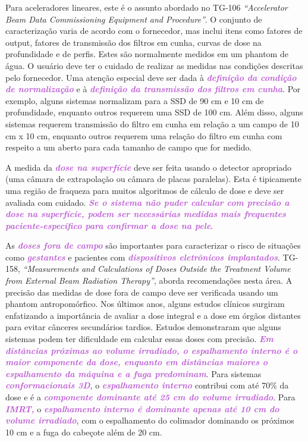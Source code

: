 \documentclass[11pt,a4paper]{article}
\newcounter{exemplo}
\begin{document}
	Para aceleradores lineares, este é o assunto abordado no TG-106 \textit{``Accelerator Beam Data Commissioning Equipment and Procedure''}. O conjunto de caracterização varia de acordo com o fornecedor, mas inclui itens como fatores de output, fatores de transmissão dos filtros em cunha, curvas de dose na profundidade e de perfis. Estes são normalmente medidos em um phantom de água. O usuário deve ter o cuidado de realizar as medidas nas condições descritas pelo fornecedor. Uma atenção especial deve ser dada à \textcolor{MediumOrchid}{\textbf{\textit{definição da condição de normalização}}} e à \textcolor{MediumOrchid}{\textbf{\textit{definição da transmissão dos filtros em cunha}}}. Por exemplo, alguns sistemas normalizam para a SSD de 90 cm e 10 cm de profundidade, enquanto outros requerem uma SSD de 100 cm. Além disso, alguns sistemas requerem transmissão do filtro em cunha em relação a um campo de 10 cm x 10 cm, enquanto outros requerem uma relação do filtro em cunha com respeito a um aberto para cada tamanho de campo que for medido.

	A medida da \textcolor{MediumOrchid}{\textbf{\textit{dose na superfície}}} deve ser feita usando o detector apropriado (uma câmara de extrapolação ou câmara de placas paralelas). Esta é tipicamente uma região de fraqueza para muitos algoritmos de cálculo de dose e deve ser avaliada com cuidado. \textcolor{MediumOrchid}{\textbf{\textit{Se o sistema não puder calcular com precisão a dose na superfície, podem ser necessárias medidas mais frequentes paciente-específico para confirmar a dose na pele}}}.

	As \textcolor{MediumOrchid}{\textbf{\textit{doses fora de campo}}} são importantes para caracterizar o risco de situações como \textcolor{MediumOrchid}{\textbf{\textit{gestantes}}} e pacientes com \textcolor{MediumOrchid}{\textbf{\textit{dispositivos eletrônicos implantados}}}. TG-158, \textit{``Measurements and Calculations of Doses Outside the Treatment Volume from External Beam Radiation Therapy''}, aborda recomendações nesta área. A precisão das medidas de dose fora de campo deve ser verificada usando um phantom antropomórfico. Nos últimos anos, alguns estudos clínicos surgiram enfatizando a importância de avaliar a dose integral e a dose em órgãos distantes para evitar cânceres secundários tardios. Estudos demonstraram que alguns sistemas podem ter dificuldade em calcular essas doses com precisão. \textcolor{MediumOrchid}{\textbf{\textit{Em distâncias próximas ao volume irradiado, o espalhamento interno é o maior componente da dose, enquanto em distâncias maiores o espalhamento da máquina e a fuga predominam}}}. Para sistemas \textcolor{MediumOrchid}{\textbf{\textit{conformacionais 3D}}}, o \textcolor{MediumOrchid}{\textbf{\textit{espalhamento interno}}} contribui com até 70\% da dose e é a \textcolor{MediumOrchid}{\textbf{\textit{componente dominante  até 25 cm do volume irradiado}}}. Para \textcolor{MediumOrchid}{\textbf{\textit{IMRT,}}} o \textcolor{MediumOrchid}{\textbf{\textit{espalhamento interno é dominante apenas até 10 cm do volume irradiado}}}, com o espalhamento do colimador dominando os próximos 10 cm e a fuga do cabeçote além de 20 cm.
\end{document}
